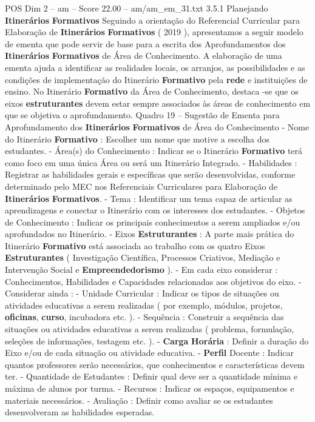 \begin{textsample}{POS Dim 2 – am – Score 22.00 – am/am\_em\_31.txt}  \label{ex:f2_pos_158}
3.5.1 Planejando \textbf{Itinerários} \textbf{Formativos} Seguindo a orientação do Referencial Curricular para Elaboração de \textbf{Itinerários} \textbf{Formativos} ( 2019 ), apresentamos a seguir modelo de ementa que pode servir de base para a escrita dos Aprofundamentos dos \textbf{Itinerários} \textbf{Formativos} de Área de Conhecimento.
A elaboração de uma ementa ajuda a identificar as realidades locais, os arranjos, as possibilidades e as condições de implementação do Itinerário \textbf{Formativo} pela \textbf{rede} e instituições de ensino.
No Itinerário \textbf{Formativo} da Área de Conhecimento, destaca -se que os eixos \textbf{estruturantes} devem estar sempre associados às áreas de conhecimento em que se objetiva o aprofundamento.
Quadro 19 – Sugestão de Ementa para Aprofundamento dos \textbf{Itinerários} \textbf{Formativos} de Área do Conhecimento - Nome do Itinerário \textbf{Formativo} : Escolher um nome que motive a escolha dos estudantes. - Área(s) do Conhecimento : Indicar se o Itinerário \textbf{Formativo} terá como foco em uma única Área ou será um Itinerário Integrado. - Habilidades : Registrar as habilidades gerais e específicas que serão desenvolvidas, conforme determinado pelo MEC nos Referenciais Curriculares para Elaboração de \textbf{Itinerários} \textbf{Formativos}. - Tema : Identificar um tema capaz de articular as aprendizagens e conectar o Itinerário com os interesses dos estudantes. - Objetos de Conhecimento : Indicar os principais conhecimentos a serem ampliados e/ou aprofundados no Itinerário. - Eixos \textbf{Estruturantes} : A parte mais prática do Itinerário \textbf{Formativo} está associada ao trabalho com os quatro Eixos \textbf{Estruturantes} ( Investigação Científica, Processos Criativos, Mediação e Intervenção Social e \textbf{Empreendedorismo} ). - Em cada eixo considerar : Conhecimentos, Habilidades e Capacidades relacionadas aos objetivos do eixo. - Considerar ainda : - Unidade Curricular : Indicar os tipos de situações ou atividades educativas a serem realizadas ( por exemplo, módulos, projetos, \textbf{oficinas}, \textbf{curso}, incubadora etc. ). - Sequência : Construir a sequência das situações ou atividades educativas a serem realizadas ( problema, formulação, seleções de informações, testagem etc. ). - \textbf{Carga} \textbf{Horária} : Definir a duração do Eixo e/ou de cada situação ou atividade educativa. - \textbf{Perfil} Docente : Indicar quantos professores serão necessários, que conhecimentos e características devem ter. - Quantidade de Estudantes : Definir qual deve ser a quantidade mínima e máxima de alunos por turma. - Recursos : Indicar os espaços, equipamentos e materiais necessários. - Avaliação : Definir como avaliar se os estudantes desenvolveram as habilidades esperadas.

\end{textsample}
